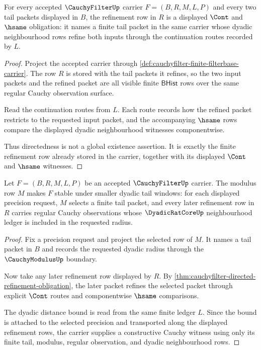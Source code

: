 \begin{theorem}
\label{thm:cauchyfilter-directed-refinement-obligation}
For every accepted $\CauchyFilterUp$ carrier $F=(B,R,M,L,P)$ and every two
tail packets displayed in $B$, the refinement row in $R$ is a displayed
$\Cont$ and $\hsame$ obligation: it names a finite tail packet in the same
carrier whose dyadic neighbourhood rows refine both inputs through the
continuation routes recorded by $L$.
\end{theorem}
\begin{proof}
Project the accepted carrier through
\autoref{def:cauchyfilter-finite-filterbase-carrier}. The row $R$ is stored
with the tail packets it refines, so the two input packets and the refined
packet are all visible finite $\mathsf{BHist}$ rows over the same regular
Cauchy observation surface.

Read the continuation routes from $L$. Each route records how the refined
packet restricts to the requested input packet, and the accompanying $\hsame$
rows compare the displayed dyadic neighbourhood witnesses componentwise.

Thus directedness is not a global existence assertion. It is exactly the
finite refinement row already stored in the carrier, together with its
displayed $\Cont$ and $\hsame$ witnesses.
\end{proof}

\begin{theorem}
\label{thm:cauchyfilter-cauchy-modulus-obligation}
Let $F=(B,R,M,L,P)$ be an accepted $\CauchyFilterUp$ carrier. The modulus row
$M$ makes $F$ stable under smaller dyadic tail windows: for each displayed
precision request, $M$ selects a finite tail packet, and every later
refinement row in $R$ carries regular Cauchy observations whose
$\DyadicRatCoreUp$ neighbourhood ledger is included in the requested radius.
\end{theorem}
\begin{proof}
Fix a precision request and project the selected row of $M$. It names a tail
packet in $B$ and records the requested dyadic radius through the
$\CauchyModulusUp$ boundary.

Now take any later refinement row displayed by $R$. By
\autoref{thm:cauchyfilter-directed-refinement-obligation}, the later packet
refines the selected packet through explicit $\Cont$ routes and componentwise
$\hsame$ comparisons.

The dyadic distance bound is read from the same finite ledger $L$. Since the
bound is attached to the selected precision and transported along the displayed
refinement rows, the carrier supplies a constructive Cauchy witness using only
its finite tail, modulus, regular observation, and dyadic neighbourhood rows.
\end{proof}

